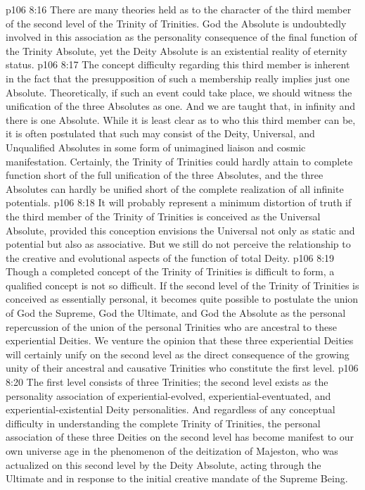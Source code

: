 \vs p106 8:16 \bibnobreakspace {} There are many theories held as to the character of the third member of the second level of the Trinity of Trinities. God the Absolute is undoubtedly involved in this association as the personality consequence of the final function of the Trinity Absolute, yet the Deity Absolute is an existential reality of eternity status.
\vs p106 8:17 The concept difficulty regarding this third member is inherent in the fact that the presupposition of such a membership really implies just one Absolute. Theoretically, if such an event could take place, we should witness the  unification of the three Absolutes as one. And we are taught that, in infinity and  there is one Absolute. While it is least clear as to who this third member can be, it is often postulated that such may consist of the Deity, Universal, and Unqualified Absolutes in some form of unimagined liaison and cosmic manifestation. Certainly, the Trinity of Trinities could hardly attain to complete function short of the full unification of the three Absolutes, and the three Absolutes can hardly be unified short of the complete realization of all infinite potentials.
\vs p106 8:18 It will probably represent a minimum distortion of truth if the third member of the Trinity of Trinities is conceived as the Universal Absolute, provided this conception envisions the Universal not only as static and potential but also as associative. But we still do not perceive the relationship to the creative and evolutional aspects of the function of total Deity.
\vs p106 8:19 Though a completed concept of the Trinity of Trinities is difficult to form, a qualified concept is not so difficult. If the second level of the Trinity of Trinities is conceived as essentially personal, it becomes quite possible to postulate the union of God the Supreme, God the Ultimate, and God the Absolute as the personal repercussion of the union of the personal Trinities who are ancestral to these experiential Deities. We venture the opinion that these three experiential Deities will certainly unify on the second level as the direct consequence of the growing unity of their ancestral and causative Trinities who constitute the first level.
\vs p106 8:20 The first level consists of three Trinities; the second level exists as the personality association of experiential\hyp{}evolved, experiential\hyp{}eventuated, and experiential\hyp{}existential Deity personalities. And regardless of any conceptual difficulty in understanding the complete Trinity of Trinities, the personal association of these three Deities on the second level has become manifest to our own universe age in the phenomenon of the deitization of Majeston, who was actualized on this second level by the Deity Absolute, acting through the Ultimate and in response to the initial creative mandate of the Supreme Being.

